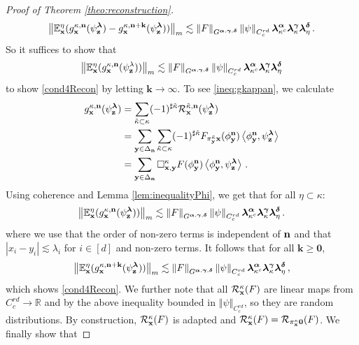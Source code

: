 \documentclass[12pt]{article}
\numberwithin{equation}{section}
\theoremstyle{plain}
\theoremstyle{definition}
\newcommand{\abs}[1]{\left\vert #1 \right\vert}
\newcommand{\scalar}[1]{\left\langle #1 \right\rangle}
\newcommand{\norm}[1]{\left\Vert #1\right\Vert}
\def\bR{\mathbb{R}}\def\bS{\mathbb{S}}
\def\bE{\mathbb{E}}\def\bW{\mathbb{W}}
\def\fk{\mathbf k}\def\fl{\mathbf l}
\def\fy{\mathbf y}\def\fz{\mathbf z}
\def\falpha{{\boldsymbol\alpha}}
\def\fgamma{{\boldsymbol\gamma}}
\def\fdelta{{\boldsymbol\delta}}
\def\flambda{{\boldsymbol\lambda}}
\def\foo{{\boldsymbol 0}}
\begin{document}
\begin{proof}[Proof of Theorem \ref{theo:reconstruction}]
    \begin{equation*}
\norm{\bE^{\eta}_\fx(g^{\kappa,\fn}_\fx(\psi_\fz^\flambda)- g^{\kappa,\fn+\fk}_\fx(\psi_\fz^\flambda))}_m\lesssim\norm{F}_{G^{\falpha,\fgamma,\fdelta}}\norm{\psi}_{C_c^{rd}}\flambda^{\falpha}_{{\kappa^c}}\flambda^{\fgamma}_{\kappa}\flambda^{\fdelta}_{\eta}\,.
    \end{equation*}
    So it suffices to show that
    \begin{equation}\label{ineq:gkappan}
\norm{\bE^{\eta}_\fx(g^{\kappa,\fn}_\fx(\psi_\fz^\lambda))}_m\lesssim\norm{F}_{G^{\falpha,\fgamma,\fdelta}}\norm{\psi}_{C_c^{rd}}\flambda^{\falpha}_{{\kappa^c}}\flambda^{\fgamma}_{\kappa}\flambda^{\fdelta}_{\eta}
    \end{equation}
to show \eqref{cond4Recon} by letting $\fk\to\infty$. To see \eqref{ineq:gkappan}, we calculate
    \begin{align*}
        g^{\kappa,\fn}_\fx(\psi_\fz^\flambda) &= \sum_{\tilde\kappa\subset\kappa}(-1)^{\sharp{\tilde\kappa}}\mathcal{R}^{\tilde\kappa,\fn}_\fx(\psi_\fz^\flambda) \\
        &= \sum_{\fy\in\Delta_{\fn}}\sum_{\tilde\kappa\subset\kappa} (-1)^{\sharp{\tilde\kappa}}F_{\pi_\fy^{\tilde\kappa} \fx}(\phi_\fy^{\fn})\scalar{\phi_\fy^{\fn},\psi_\fz^{\flambda}}\\
        &= \sum_{\fy\in\Delta_{\fn}}\square^{\kappa}_{\fx,\fy}F(\phi_\fy^{\fn})\scalar{\phi_\fy^{\fn},\psi_\fz^{\flambda}}\,.
    \end{align*}
%
    Using coherence and  Lemma \ref{lem:inequalityPhi}, we get that for all $\eta\subset\kappa$:
    \begin{equation*}
\norm{\bE^{\eta}_\fx(g^{\kappa,\fn}_\fx(\psi_\fz^\flambda))}_m\lesssim \norm{F}_{G^{\falpha,\fgamma,\fdelta}}\norm{\psi}_{C_c^{rd}}\flambda^{\falpha}_{{\kappa^c}}\flambda^{\fgamma}_{\kappa}\flambda^{\fdelta}_{\eta}\,.
    \end{equation*}
where we use that the order of non-zero terms is independent of $\mathbf n$ and that $\abs{x_i-y_i}\lesssim \lambda_i$ for $i\in[d]$ and non-zero terms. It follows that for all $\fk\ge \foo$,
\begin{equation*}
\norm{\bE^{\eta}_\fx(g^{\kappa,\fn+\fk}_\fx(\psi_\fz^\flambda))}_m\lesssim \norm{F}_{G^{\falpha,\fgamma,\fdelta}}\norm{\psi}_{C_c^{rd}}\flambda^{\falpha}_{{\kappa^c}}\flambda^{\fgamma}_{\kappa}\flambda^{\fdelta}_{\eta}\,,
\end{equation*}
which shows \eqref{cond4Recon}. We further note that all $\mathcal{R}^\kappa_\mathbf x(F)$ are linear maps from $C_c^{rd}\to\bR$ and by the above inequality bounded in $\norm{\psi}_{C_c^{rd}}$, so they are random distributions. By construction, $\mathcal{R}^\kappa_\mathbf x(F)$ is adapted and $\mathcal{R}_\fx^\kappa(F) = \mathcal{R}_{\pi_\fx^\kappa \foo}(F)$. We finally show that

\end{proof}
\end{document}

